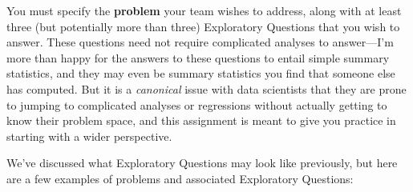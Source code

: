 \documentclass[12pt]{article}
\begin{document}
You must specify the \textbf{problem} your team wishes to address, along with at least three (but potentially more than three) Exploratory Questions that you wish to answer. These questions need not require complicated analyses to answer—I'm more than happy for the answers to these questions to entail simple summary statistics, and they may even be summary statistics you find that someone else has computed. But it is a \emph{canonical} issue with data scientists that they are prone to jumping to complicated analyses or regressions without actually getting to know their problem space, and this assignment is meant to give you practice in starting with a wider perspective.

We've discussed what Exploratory Questions may look like previously, but here are a few examples of problems and associated Exploratory Questions:
\end{document}
